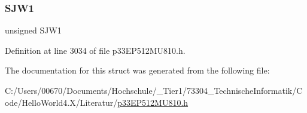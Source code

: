 \subsubsection{\texorpdfstring{S\+J\+W1}{SJW1}}
{\footnotesize\ttfamily unsigned S\+J\+W1}



Definition at line 3034 of file p33\+E\+P512\+M\+U810.\+h.



The documentation for this struct was generated from the following file\+:\begin{DoxyCompactItemize}
\item 
C\+:/\+Users/00670/\+Documents/\+Hochschule/\+\_\+\+Tier1/73304\+\_\+\+Technische\+Informatik/\+Code/\+Hello\+World4.\+X/\+Literatur/\hyperlink{p33_e_p512_m_u810_8h}{p33\+E\+P512\+M\+U810.\+h}\end{DoxyCompactItemize}
